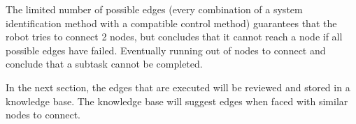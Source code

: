 The limited number of possible edges (every combination of a system identification method with a compatible control method) guarantees that the robot tries to connect 2 nodes, but concludes that it cannot reach a node if all possible edges have failed. Eventually running out of nodes to connect and conclude that a subtask cannot be completed.\bs

In the next section, the edges that are executed will be reviewed and stored in a knowledge base. The knowledge base will suggest edges when faced with similar nodes to connect.
\
